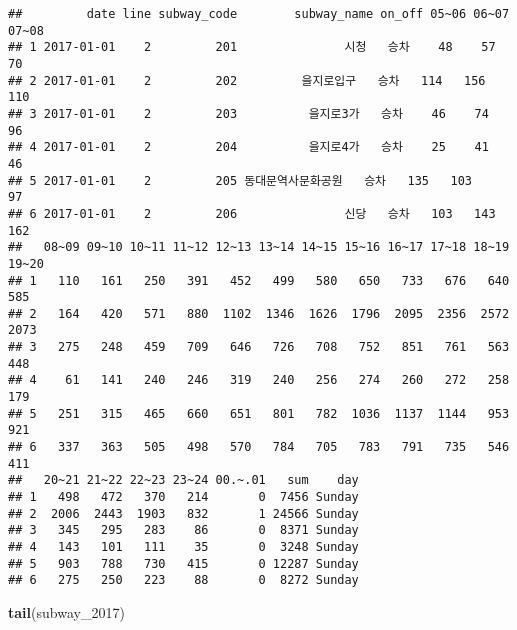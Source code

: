 \documentclass[]{article}
\newenvironment{Shaded}{\begin{snugshade}}{\end{snugshade}}
\newcommand{\KeywordTok}[1]{\textcolor[rgb]{0.13,0.29,0.53}{\textbf{#1}}}
\newcommand{\DecValTok}[1]{\textcolor[rgb]{0.00,0.00,0.81}{#1}}
\newcommand{\NormalTok}[1]{#1}
\begin{document}
\begin{verbatim}
##         date line subway_code        subway_name on_off 05~06 06~07 07~08
## 1 2017-01-01    2         201               시청   승차    48    57    70
## 2 2017-01-01    2         202         을지로입구   승차   114   156   110
## 3 2017-01-01    2         203          을지로3가   승차    46    74    96
## 4 2017-01-01    2         204          을지로4가   승차    25    41    46
## 5 2017-01-01    2         205 동대문역사문화공원   승차   135   103    97
## 6 2017-01-01    2         206               신당   승차   103   143   162
##   08~09 09~10 10~11 11~12 12~13 13~14 14~15 15~16 16~17 17~18 18~19 19~20
## 1   110   161   250   391   452   499   580   650   733   676   640   585
## 2   164   420   571   880  1102  1346  1626  1796  2095  2356  2572  2073
## 3   275   248   459   709   646   726   708   752   851   761   563   448
## 4    61   141   240   246   319   240   256   274   260   272   258   179
## 5   251   315   465   660   651   801   782  1036  1137  1144   953   921
## 6   337   363   505   498   570   784   705   783   791   735   546   411
##   20~21 21~22 22~23 23~24 00.~.01   sum    day
## 1   498   472   370   214       0  7456 Sunday
## 2  2006  2443  1903   832       1 24566 Sunday
## 3   345   295   283    86       0  8371 Sunday
## 4   143   101   111    35       0  3248 Sunday
## 5   903   788   730   415       0 12287 Sunday
## 6   275   250   223    88       0  8272 Sunday
\end{verbatim}

\begin{Shaded}
\begin{Highlighting}[]
\KeywordTok{tail}\NormalTok{(subway_}\DecValTok{2017}\NormalTok{)}
\end{Highlighting}
\end{Shaded}
\end{document}
